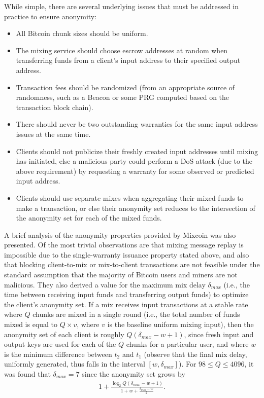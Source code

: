 While simple, there are several underlying issues that must be addressed in practice to ensure anonymity:
\begin{itemize}
	\item All Bitcoin chunk sizes should be uniform.
	\item The mixing service should choose escrow addresses at random when transferring funds from a client's input address to their specified output address.
	\item Transaction fees should be randomized (from an appropriate source of randomness, such as a Beacon \cite{nist-beacon} or some PRG computed based on the transaction block chain).
	\item There should never be two outstanding warranties for the same input address issues at the same time.
	\item Clients should not publicize their freshly created input addresses until mixing has initiated, else a malicious party could perform a DoS attack (due to the above requirement) by requesting a warranty for some observed or predicted input address.
	\item Clients should use separate mixes when aggregating their mixed funds to make a transaction, or else their anonymity set reduces to the intersection of the anonymity set for each of the mixed funds.
\end{itemize}

A brief analysis of the anonymity properties provided by Mixcoin was also presented. Of the most trivial observations are that mixing message replay is impossible due to the single-warranty issuance property stated above, and also that blocking client-to-mix or mix-to-client transactions are not feasible under the standard assumption that the majority of Bitcoin users and miners are not malicious. They also derived a value for the maximum mix delay $\delta_{max}$ (i.e., the time between receiving input funds and transferring output funds) to optimize the client's anonymity set. If a mix receives input transactions at a stable rate where $Q$ chunks are mixed in a single round (i.e., the total number of funds mixed is equal to $Q \times v$, where $v$ is the baseline uniform mixing input), then the anonymity set of each client is roughly $Q(\delta_{max} - w + 1)$, since fresh input and output keys are used for each of the $Q$ chunks for a particular user, and where $w$ is the minimum difference between $t_2$ and $t_1$ (observe that the final mix delay, uniformly generated, thus falls in the interval $[w, \delta_{max}]$). For $98 \leq Q \leq 4096$, it was found that $\delta_{max} = 7$ since the anonymity set grows by 
\begin{align*}
1 + \frac{\log_2Q(\delta_{max} - w + 1)}{1 + w + \frac{\delta_{max} - w}{2}}.
\end{align*} 

